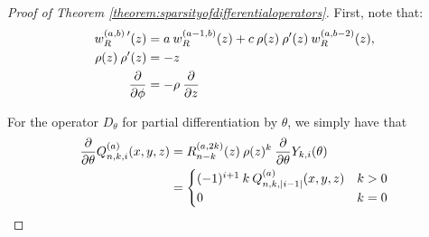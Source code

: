 \documentclass[11pt, oneside]{article}   	%
\newcommand{\genjac}{R}
\newcommand{\genjacnmk}{\genjac_{n-k}}
\newcommand{\genjacw}{w_\genjac}
\newcommand{\scop}{Q}
\newcommand{\scopnki}{\scop_{n,k,i}}
\newcommand{\scopa}{\scop^{(a)}}
\newcommand{\scopnkia}{\scopnki^{(a)}}
\newcommand{\ch}{Y}
\newcommand{\chki}{\ch_{k,i}}
\begin{document}
\begin{proof}[Proof of Theorem \ref{theorem:sparsityofdifferentialoperators}]
First, note that:
\begin{align}
	\genjacw^{(a,b) \: \prime}(z) &= a \: \genjacw^{(a-1,b)}(z) + c \: \rho(z) \: \rho'(z) \:\genjacw^{(a,b-2)}(z), \label{eqn:derivativeofweightgenjac} \\
	\rho(z) \: \rho'(z) &= -z \label{eqn:rhoderivative} \\
	{\partial \over \partial \phi} &= -\rho \: {\partial \over \partial z} \label{eqn:partialphitoz} 
\end{align}

For the operator $D_\theta$ for partial differentiation by $\theta$, we simply have that
\begin{align*}
	{\partial \over \partial \theta}\scopnkia(x,y,z) &= \genjacnmk^{(a,2k)}(z) \: \rho(z)^{k} \: {\partial \over \partial \theta} \chki(\theta) \\
	&= 
	\begin{cases}
		(-1)^{i+1} \: k \: \scopa_{n,k,|i-1|}(x,y,z) & k > 0 \\
		0 & k = 0
	\end{cases}
\end{align*}


\end{proof}
\end{document}
